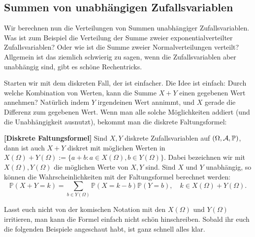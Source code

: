 \subsection{Summen von unabhängigen Zufallsvariablen}
Wir berechnen nun die Verteilungen von Summen unabhängiger Zufallsvariablen. Was ist zum Beispiel die Verteilung der Summe zweier exponentialverteilter Zufallsvariablen? Oder wie ist die Summe zweier Normalverteilungen verteilt? Allgemein ist das ziemlich schwierig zu sagen, wenn die Zufallsvariablen aber unabh\"angig sind, gibt es sch\"one Rechentricks.\smallskip

Starten wir mit dem diskreten Fall, der ist einfacher. Die Idee ist einfach: Durch welche Kombination von Werten, kann die Summe $X+Y$ einen gegebenen Wert annehmen? Nat\"urlich indem $Y$ irgendeinen Wert annimmt, und $X$ gerade die Differenz zum gegebenen Wert. Wenn man alle solche M\"oglichkeiten addiert (und die Unabh\"angigkeit ausnutzt), bekommt man die diskrete Faltungsformel:
\begin{satz}\label{diskreteFaltung}
 \textbf{[Diskrete Faltungsformel]}
	Sind $X,Y$ diskrete Zufallsvariablen auf $(\Omega, \mathcal{A}, \mathbb{P})$, dann ist auch $X+Y$ diskret mit m\"oglichen Werten in $X(\Omega)+Y(\Omega):=\{a+b: a\in X(\Omega), b\in Y(\Omega)\}$. Dabei bezeichnen wir mit $X(\Omega), Y(\Omega)$ die m\"oglichen Werte von $X,Y$ sind. Sind $X$ und $Y$ unabh\"angig, so k\"onnen die Wahrscheinlichkeiten mit der Faltungsformel berechnet werden:
	\[ \mathbb{P}(X+Y = k) = \sum\limits_{b \in Y(\Omega)} \mathbb{P}(X = k-b) \mathbb{P}(Y=b),\quad k\in X(\Omega)+Y(\Omega).
	\]
\end{satz}
Lasst euch nicht von der komischen Notation mit den $X(\Omega)$ und $Y(\Omega)$ irritieren, man kann die Formel einfach nicht sch\"on hinschreiben. Sobald ihr euch die folgenden Beispiele angeschaut habt, ist ganz schnell alles klar.
